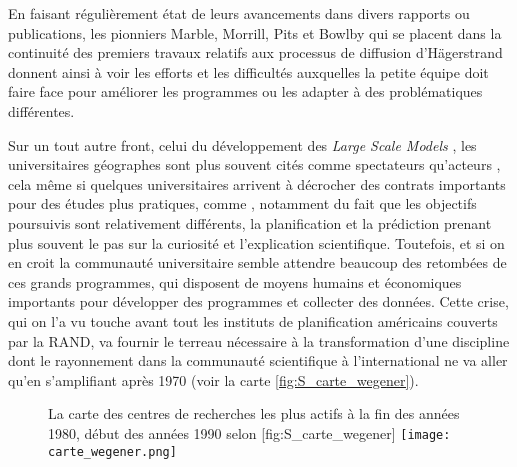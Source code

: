 En faisant régulièrement état de leurs avancements dans divers rapports ou publications, les pionniers Marble, Morrill, Pits et Bowlby \autocite{Pitts1963} qui se placent dans la continuité des premiers travaux relatifs aux processus de diffusion d'Hägerstrand \autocite{Hagerstrand1953, Hagerstrand1967a} donnent ainsi à voir les efforts et les difficultés auxquelles la petite équipe doit faire face pour améliorer les programmes ou les adapter à des problématiques différentes.

Sur un tout autre front, celui du développement des \textit{Large Scale Models} \autocites[8]{Batty1976}, les universitaires géographes sont plus souvent cités comme spectateurs qu'acteurs \autocites[9]{Batty1994}[153]{Batty1989}, cela même si quelques universitaires arrivent à décrocher des contrats importants \autocite{Barnes2006a} pour des études plus pratiques, comme \textcite{Garrison1959}, notamment du fait que les objectifs poursuivis sont relativement différents, la planification et la prédiction prenant plus souvent le pas sur la curiosité et l'explication scientifique. Toutefois, et si on en croit \textcite{Haggett1969} la communauté universitaire semble attendre beaucoup des retombées de ces grands programmes, qui disposent de moyens humains et économiques importants pour développer des programmes et collecter des données. Cette crise, qui on l'a vu touche avant tout les instituts de planification américains couverts par la RAND, va fournir le terreau nécessaire à la transformation d'une discipline dont le rayonnement dans la communauté scientifique à l'international ne va aller qu'en s'amplifiant après 1970 (voir la carte \ref{fig:S_carte_wegener}).

\begin{figure}[htbp]
\begin{sidecaption}[fortoc]{La carte des centres de recherches les plus actifs à la fin des années 1980, début des années 1990 selon \textcite{Wegener1994}}[fig:S_carte_wegener]
  \centering
 \texttt{[image: carte\_wegener.png]}
  \end{sidecaption}
\end{figure}

